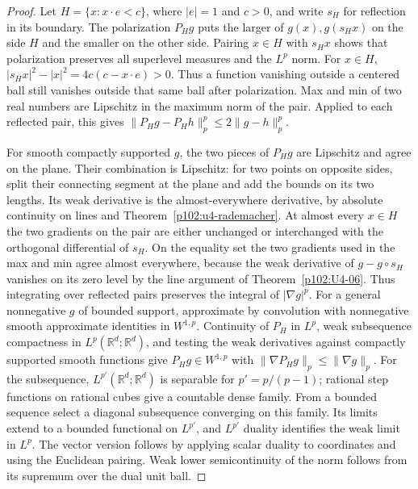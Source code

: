 \documentclass[11pt,oneside,openany]{book}
\theoremstyle{definition}
\theoremstyle{remark}
\begin{document}
\begin{proof}
Let \(H=\{x:x\cdot e<c\}\), where \(|e|=1\) and \(c>0\), and write
\(s_H\) for reflection in its boundary. The polarization \(P_Hg\) puts
the larger of \(g(x),g(s_Hx)\) on the side \(H\) and the smaller on the
other side. Pairing \(x\in H\) with \(s_Hx\) shows that polarization
preserves all superlevel measures and the \(L^p\) norm. For \(x\in H\),
\(|s_Hx|^2-|x|^2=4c(c-x\cdot e)>0\). Thus a function vanishing
outside a centered ball still vanishes outside that same ball after
polarization. Max and min of two real numbers are Lipschitz in the
maximum norm of the pair. Applied to each reflected pair, this gives
\(\|P_Hg-P_Hh\|_p^p\le 2\|g-h\|_p^p\).

For smooth compactly supported \(g\), the two pieces of \(P_Hg\)
are Lipschitz and agree on the plane. Their combination is Lipschitz:
for two points on opposite sides, split their connecting segment at
the plane and add the bounds on its two lengths. Its weak derivative
is the almost-everywhere derivative, by absolute continuity on lines
and Theorem~\ref{p102:u4-rademacher}. At almost every \(x\in H\) the two
gradients on the pair are either unchanged or interchanged with the
orthogonal differential of \(s_H\). On the equality set the two
gradients used in the max and min agree almost everywhere, because
the weak derivative of \(g-g\circ s_H\) vanishes on its zero level
by the line argument of Theorem~\ref{p102:U4-06}. Thus integrating
over reflected pairs preserves the integral of \(|\nabla g|^p\).
For a general nonnegative \(g\) of bounded support, approximate by
convolution with nonnegative smooth approximate identities in
\(W^{1,p}\). Continuity of \(P_H\) in \(L^p\), weak subsequence
compactness in \(L^p(\mathbb R^d;\mathbb R^d)\), and testing the
weak derivatives against compactly supported smooth functions give
\(P_Hg\in W^{1,p}\) with \(\|\nabla P_Hg\|_p\le\|\nabla g\|_p\).
For the subsequence, \(L^{p'}(\mathbb R^d;\mathbb R^d)\) is separable
for \(p'=p/(p-1)\); rational step functions on rational cubes give
a countable dense family. From a bounded sequence select a diagonal
subsequence converging on this family. Its limits extend to a
bounded functional on \(L^{p'}\), and \(L^{p'}\) duality
\cite[Section D11.20]{d11} identifies the weak limit in \(L^p\).
The vector version follows by applying scalar duality to coordinates
and using the Euclidean pairing. Weak lower semicontinuity of the
norm follows from its supremum over the dual unit ball.


\end{proof}
\end{document}
